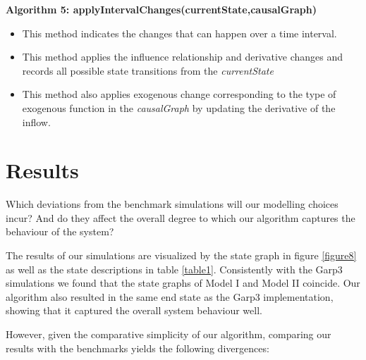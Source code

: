 \documentclass{article}
\begin{document}
\textbf{Algorithm 5: applyIntervalChanges(currentState,causalGraph)}
\begin{itemize}
	\item This method indicates the changes that can happen over a time interval.
	\item This method applies the influence relationship and derivative changes and records all possible state transitions from the \textit{currentState}
	\item This method also applies exogenous change corresponding to the type of exogenous function in the \textit{causalGraph} by updating the derivative of the inflow.  
\end{itemize}

\section{Results}

Which deviations from the benchmark simulations will our modelling choices incur? And do they affect the overall degree to which our algorithm captures the behaviour of the system? 

The results of our simulations are visualized by the state graph in figure \ref{figure8} as well as the state descriptions in table \ref{table1}. Consistently with the Garp3 simulations we found that the state graphs of Model I and Model II coincide. Our algorithm also resulted in the same end state as the Garp3 implementation, showing that it captured the overall system behaviour well.

However, given the comparative simplicity of our algorithm, comparing our results with the benchmarks yields the following divergences:
\end{document}
